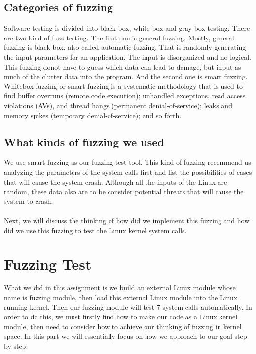 \documentclass[twoside]{article}
\begin{document}
\begin{multicols}{2}
\subsection{Categories of fuzzing}
Software testing is divided into black box, white-box and gray box testing. There are two kind of fuzz testing. The first one is general fuzzing. Mostly, general fuzzing is black box, also called automatic fuzzing. That is randomly generating the input parameters for an application. The input is disorganized and no logical. This fuzzing donot have to guess which data can lead to damage, but input as much of the clutter data into the program.  And the second one is smart fuzzing. Whitebox fuzzing or smart fuzzing is a systematic methodology that is used to find buffer overruns (remote code execution); unhandled exceptions, read access violations (AVs), and thread hangs (permanent denial-of-service); leaks and memory spikes (temporary denial-of-service); and so forth.\cite{demott2006fuzzing,godefroid2008grammar}
\subsection{What kinds of fuzzing we used}
We use smart fuzzing as our fuzzing test tool. This kind of fuzzing recommend us analyzing the parameters of the system calls first and list the possibilities of cases that will cause the system crash. Although all the inputs of the Linux are random, these data also are to be consider potential threats  that  will cause the system to crash.\\\\
Next, we will discuss the thinking of how did we implement this fuzzing and how did we use this fuzzing to test the Linux kernel system calls.
\section{Fuzzing Test}
What we did in this assignment is we build an external Linux module whose name is fuzzing module, then load this external Linux module into the Linux running kernel. Then our fuzzing module will test 7 system calls automatically. In order to do this, we must firstly find how to make our code as a Linux kernel module, then need to consider how to achieve our thinking of fuzzing in kernel space. In this part we will essentially focus on how we approach to our goal step by step.

\end{multicols}
\end{document}
